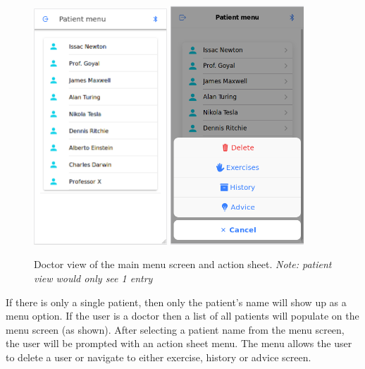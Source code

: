 \documentclass[a4paper,10pt]{article}
\begin{document}
            \begin{figure}[H]
            \centering
            \includegraphics[width=50mm, scale=1]{patientMenu}
            \includegraphics[width=50mm, scale=1]{patientMenuAction}
            \caption{Doctor view of the main menu screen and action sheet.\textit{ Note: patient view would only see 1 entry}}
            \end{figure}
            
            If there is only a single patient, then only the patient's name will show up as a menu option. If the user is a doctor then a list of all patients will populate on the menu screen (as shown). After selecting a patient name from the menu screen, the user will be prompted with an action sheet menu. The menu allows the user to delete a user or navigate to either exercise, history or advice screen. 
            
\end{document}
